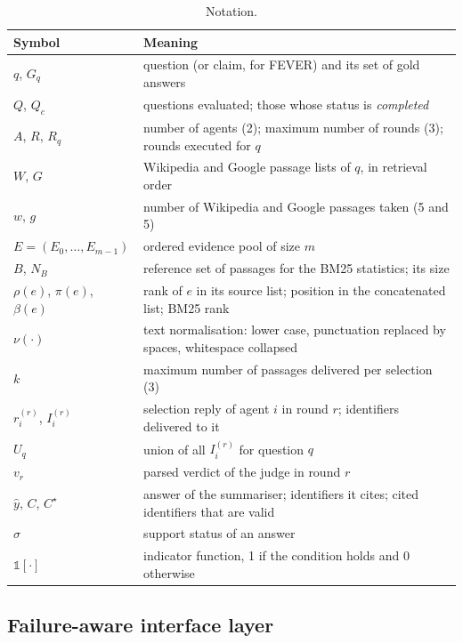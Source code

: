 \begin{table}[!htbp]
\centering
\small
\caption{Notation.}
\label{tab:notation}
\begin{tabular}{p{}p{}}
\toprule
Symbol & Meaning \\
\midrule
$q$, $G_q$ & question (or claim, for FEVER) and its set of gold answers \\
$Q$, $Q_c$ & questions evaluated; those whose status is \emph{completed} \\
$A$, $R$, $R_q$ & number of agents (2); maximum number of rounds (3); rounds executed for $q$ \\
$W$, $G$ & Wikipedia and Google passage lists of $q$, in retrieval order \\
$w$, $g$ & number of Wikipedia and Google passages taken (5 and 5) \\
$E=(E_0,\dots,E_{m-1})$ & ordered evidence pool of size $m$ \\
$B$, $N_B$ & reference set of passages for the BM25 statistics; its size \\
$\rho(e)$, $\pi(e)$, $\beta(e)$ & rank of $e$ in its source list; position in the concatenated list; BM25 rank \\
$\nu(\cdot)$ & text normalisation: lower case, punctuation replaced by spaces, whitespace collapsed \\
$k$ & maximum number of passages delivered per selection (3) \\
$r_i^{(r)}$, $I_i^{(r)}$ & selection reply of agent $i$ in round $r$; identifiers delivered to it \\
$U_q$ & union of all $I_i^{(r)}$ for question $q$ \\
$v_r$ & parsed verdict of the judge in round $r$ \\
$\hat y$, $C$, $C^\star$ & answer of the summariser; identifiers it cites; cited identifiers that are valid \\
$\sigma$ & support status of an answer \\
$\mathbb{1}[\cdot]$ & indicator function, 1 if the condition holds and 0 otherwise \\
\bottomrule
\end{tabular}
\end{table}

\subsection{Failure-aware interface layer}
\label{sec:m_interface}

